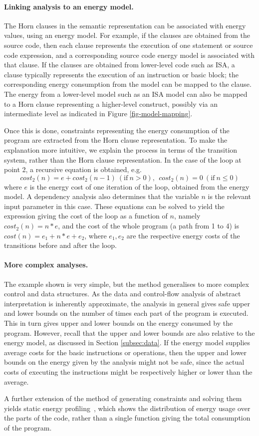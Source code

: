 \paragraph{Linking analysis to an energy model.} The Horn clauses in the semantic
representation can be 
associated with energy values, using an energy model. For example, if the clauses are obtained
from the source code, then each clause represents the execution of one statement or
source code expression, and a corresponding source code energy model is associated with
that clause.
If the clauses are obtained from lower-level code such as ISA, a clause typically represents 
the execution of
an instruction or basic block;  the corresponding energy consumption from the model can be
mapped to the clause. The energy from a lower-level model
such as an ISA model can also be mapped to a Horn clause representing 
a higher-level construct, possibly via an intermediate level as indicated in Figure \ref{fig-model-mapping}. 

Once this is done, constraints
representing the energy consumption of the program are extracted from the Horn clause 
representation. To make the explanation more intuitive, we explain the process in terms of the transition system,
rather than the Horn clause representation. In the case of the loop at point 2, a recursive equation is obtained, e.g.
\[ cost_2(n) = e + cost_2(n-1)~ (\mathrm{if}~n > 0), ~~cost_2(n) = 0 ~ (\mathrm{if}~n \le 0) \]
where $e$ is the energy cost of one iteration of the loop, obtained from the energy model. A dependency analysis
also determines that the variable $n$ is the relevant input parameter in this case. These
equations can be solved to yield the expression giving the cost of the loop as a function of $n$, 
namely $cost_2(n) = n*e$, and the cost of the whole 
program (a path from 1 to 4) is $cost(n) = e_1 + n*e + e_2$, where $e_1, e_2$ are the respective
energy costs of the transitions before and after the loop.

\paragraph{More complex analyses.} The example shown is very simple, but the method generalises to
more complex control and data structures.  
As the data and control-flow analysis of abstract interpretation is inherently approximate, 
the analysis in general gives safe upper and lower bounds on the 
number of times each part of the program is executed. This in turn gives upper and lower bounds on the energy
consumed by the program.  However, recall that the upper and lower bounds are also relative to the energy model,
as discussed in Section \ref{subsec:data}. If the energy model supplies average costs for the basic instructions
or operations, then the upper and lower bounds on the energy given by the analysis might not be safe, since the
actual costs of executing the instructions might be respectively higher or lower than the average.

A further extension of the method of generating constraints and solving them yields
static energy profiling~\cite{staticprofiling-flops}, which shows the
distribution of energy usage over the parts of the code, rather than a single function giving the total consumption of the program.
